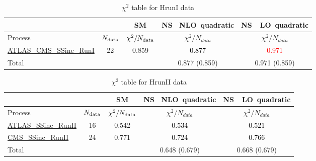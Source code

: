 \documentclass{article}
\begin{document}
\begin{table}[H]
\centering
\begin{tabular}{|l|c|c|c|c|}
\hline
 \multicolumn{2}{|c|}{} & SM& \rm NS \ NLO\ quadratic& \rm NS\ \ LO\ quadratic\\ \hline
Process & $N_{\rm data}$ & $\chi^ 2/N_{\rm data}$& $\chi^ 2/N_{data}$& $\chi^ 2/N_{data}$\\ \hline
\href{https://arxiv.org/abs/1606.02266}{ATLAS_CMS_SSinc_RunI} & 22 & 0.859 & \textcolor{black}                            {0.877} & \textcolor{red}                            {0.971} \\ \hline
\hline Total & &  & 0.877 (0.859) & 0.971 (0.859) \\ \hline
\end{tabular}
\caption{$\chi^2$ table for HrunI data}
\end{table}
\begin{table}[H]
\centering
\begin{tabular}{|l|c|c|c|c|}
\hline
 \multicolumn{2}{|c|}{} & SM& \rm NS \ NLO\ quadratic& \rm NS\ \ LO\ quadratic\\ \hline
Process & $N_{\rm data}$ & $\chi^ 2/N_{\rm data}$& $\chi^ 2/N_{data}$& $\chi^ 2/N_{data}$\\ \hline
\href{https://arxiv.org/abs/1909.02845}{ATLAS_SSinc_RunII} & 16 & 0.542 & \textcolor{black}                            {0.534} & \textcolor{black}                            {0.521} \\ \hline
\href{https://arxiv.org/abs/1809.10733}{CMS_SSinc_RunII} & 24 & 0.771 & \textcolor{black}                            {0.724} & \textcolor{black}                            {0.766} \\ \hline
\hline Total & &  & 0.648 (0.679) & 0.668 (0.679) \\ \hline
\end{tabular}
\caption{$\chi^2$ table for HrunII data}
\end{table}
\end{document}
